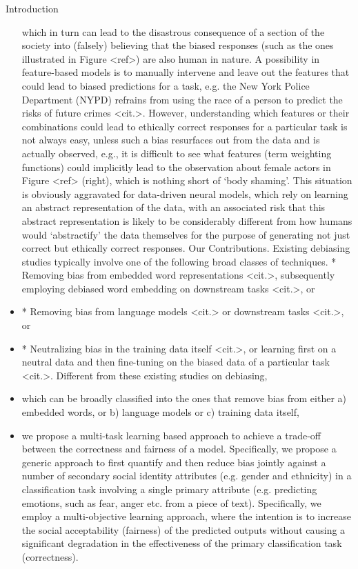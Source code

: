 \documentclass{beamer}
\begin{document}
\begin{frame}{Introduction}
\begin{itemize}
which in turn can lead to the disastrous consequence of a section of the society into (falsely) believing that the biased responses (such as the ones illustrated in Figure <ref>) are also human in nature. A possibility in feature-based models is to manually intervene and leave out the features that could lead to biased predictions for a task, e.g. the New York Police Department (NYPD) refrains from using the race of a person to predict the risks of future crimes <cit.>. However, understanding which features or their combinations could lead to ethically correct responses for a particular task is not always easy, unless such a bias resurfaces out from the data and is actually observed, e.g., it is difficult to see what features (term weighting functions) could implicitly lead to the observation about female actors in Figure <ref> (right), which is nothing short of `body shaming'. This situation is obviously aggravated for data-driven neural models, which rely on learning an abstract representation of the data, with an associated risk that this abstract representation is likely to be considerably different from how humans would `abstractify' the data themselves for the purpose of generating not just correct but ethically correct responses. Our Contributions. Existing debiasing studies typically involve one of the following broad classes of techniques. * Removing bias from embedded word representations <cit.>, subsequently employing debiased word embedding on downstream tasks <cit.>, or
\item
  * Removing bias from language models <cit.> or downstream tasks <cit.>, or
\item
  * Neutralizing bias in the training data itself <cit.>, or learning first on a neutral data and then fine-tuning on the biased data of a particular task <cit.>. Different from these existing studies on debiasing,
\item
which can be broadly classified into the ones that remove bias from either a) embedded words, or b) language models or c) training data itself,
\item
we propose a multi-task learning based approach to achieve a trade-off between the correctness and fairness of a model. Specifically, we propose a generic approach to first quantify and then reduce bias jointly against a number of secondary social identity attributes (e.g. gender and ethnicity) in a classification task involving a single primary attribute (e.g. predicting emotions, such as fear, anger etc. from a piece of text). Specifically, we employ a multi-objective learning approach, where the intention is to increase the social acceptability (fairness) of the predicted outputs without causing a significant degradation in the effectiveness of the primary classification task (correctness).
\end{itemize}
\end{frame}
\end{document}
